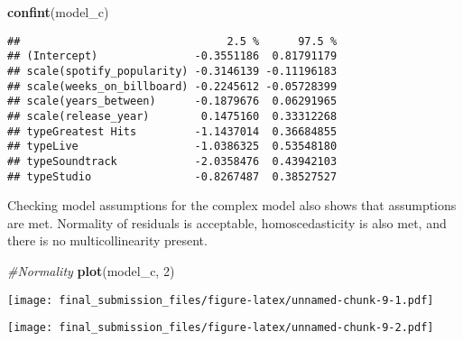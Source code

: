 \documentclass[
]{article}
\newenvironment{Shaded}{\begin{snugshade}}{\end{snugshade}}
\newcommand{\CommentTok}[1]{\textcolor[rgb]{0.56,0.35,0.01}{\textit{#1}}}
\newcommand{\DecValTok}[1]{\textcolor[rgb]{0.00,0.00,0.81}{#1}}
\newcommand{\FunctionTok}[1]{\textcolor[rgb]{0.13,0.29,0.53}{\textbf{#1}}}
\newcommand{\NormalTok}[1]{#1}
\newcommand{\SpecialCharTok}[1]{\textcolor[rgb]{0.81,0.36,0.00}{\textbf{#1}}}
\begin{document}
\begin{Shaded}
\begin{Highlighting}[]
\FunctionTok{confint}\NormalTok{(model\_c)}
\end{Highlighting}
\end{Shaded}

\begin{verbatim}
##                                2.5 %      97.5 %
## (Intercept)               -0.3551186  0.81791179
## scale(spotify_popularity) -0.3146139 -0.11196183
## scale(weeks_on_billboard) -0.2245612 -0.05728399
## scale(years_between)      -0.1879676  0.06291965
## scale(release_year)        0.1475160  0.33312268
## typeGreatest Hits         -1.1437014  0.36684855
## typeLive                  -1.0386325  0.53548180
## typeSoundtrack            -2.0358476  0.43942103
## typeStudio                -0.8267487  0.38527527
\end{verbatim}

Checking model assumptions for the complex model also shows that
assumptions are met. Normality of residuals is acceptable,
homoscedasticity is also met, and there is no multicollinearity present.

\begin{Shaded}
\begin{Highlighting}[]
\CommentTok{\#Normality}
\FunctionTok{plot}\NormalTok{(model\_c, }\DecValTok{2}\NormalTok{)}
\end{Highlighting}
\end{Shaded}

\texttt{[image: final\_submission\_files/figure-latex/unnamed-chunk-9-1.pdf]}

\begin{Shaded}
\end{Shaded}

\texttt{[image: final\_submission\_files/figure-latex/unnamed-chunk-9-2.pdf]}

\begin{Shaded}
\end{Shaded}
\end{document}
